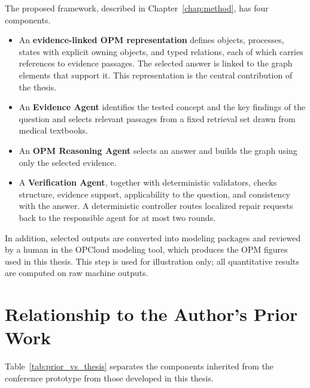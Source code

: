 The proposed framework, described in Chapter~\ref{chap:method}, has four components.

\begin{itemize}
  \item An \textbf{evidence-linked OPM representation} defines objects, processes, states with explicit owning objects, and typed relations, each of which carries references to evidence passages. The selected answer is linked to the graph elements that support it. This representation is the central contribution of the thesis.
  \item An \textbf{Evidence Agent} identifies the tested concept and the key findings of the question and selects relevant passages from a fixed retrieval set drawn from medical textbooks.
  \item An \textbf{OPM Reasoning Agent} selects an answer and builds the graph using only the selected evidence.
  \item A \textbf{Verification Agent}, together with deterministic validators, checks structure, evidence support, applicability to the question, and consistency with the answer. A deterministic controller routes localized repair requests back to the responsible agent for at most two rounds.
\end{itemize}

In addition, selected outputs are converted into modeling packages and reviewed by a human in the OPCloud modeling tool, which produces the OPM figures used in this thesis. This step is used for illustration only; all quantitative results are computed on raw machine outputs.

\section{Relationship to the Author's Prior Work}
\label{sec:prior_work}

Table~\ref{tab:prior_vs_thesis} separates the components inherited from the conference prototype from those developed in this thesis.

